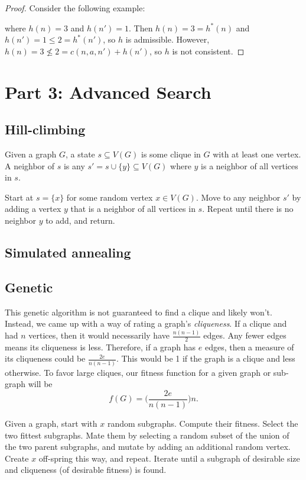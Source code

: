 \documentclass[11pt]{amsart}
\begin{document}
\begin{proof}
Consider the following example:

\vspace*{1in}

where $h(n) = 3$ and $h(n') = 1$.  Then $h(n) = 3 = h^*(n)$ and $h(n') = 1 \leq 2 = h^*(n')$,
so $h$ is admissible.  However, $h(n) = 3 \nleq 2 = c(n, a, n') + h(n')$, so $h$ is not consistent.
\end{proof}

\section*{Part 3: Advanced Search}

\subsection*{Hill-climbing}  Given a graph $G$, a state $s \subseteq V(G)$ is some clique in $G$
with at least one vertex.  A neighbor of $s$ is any $s' = s \cup \{y\} \subseteq V(G)$ where $y$ is a
neighbor of all vertices in $s$.

Start at $s = \{x\}$ for some random vertex $x \in V(G)$.  Move to any neighbor $s'$ by adding a
vertex $y$ that is a neighbor of all vertices in $s$.  Repeat until there is no neighbor $y$ to add,
and return.

\subsection*{Simulated annealing}

\subsection*{Genetic}
This genetic algorithm is not guaranteed to find a clique and likely won't.
Instead, we came up with a way of rating a graph's \emph{cliqueness}. If a
clique and had $n$ vertices, then it would necessarily have $\frac{n(n-1)}{2}$
edges. Any fewer edges means its cliqueness is less. Therefore, if a graph has $e$
edges, then a measure of its cliqueness could be $\frac{2e}{n(n-1)}$. This would be 1 if
the graph is a clique and less otherwise. To favor large cliques, our fitness
function for a given graph or sub-graph will be
\[
f(G) = \Bigg(\frac{2e}{n(n-1)}\Bigg)n.
\]

Given a graph, start with $x$ random subgraphs. Compute their fitness.
Select the two fittest subgraphs. %
Mate them by selecting a random subset of the union of
the two parent subgraphs, and mutate by adding an additional random vertex.
Create $x$ off-spring this way, and repeat. Iterate until a subgraph of desirable
size and cliqueness (of desirable fitness) is found.
\end{document}
